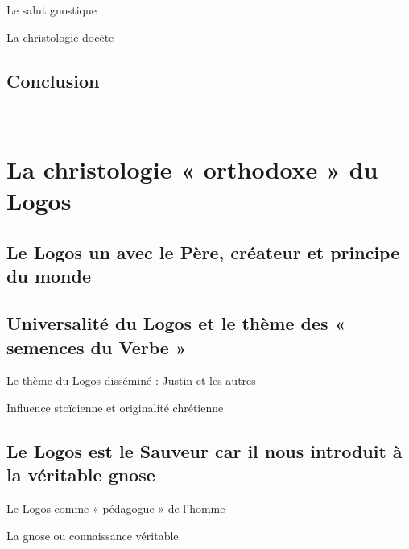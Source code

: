     
    
    
      
      Le salut gnostique
      
    
      
      La christologie docète
      
    
  
    
    \subsection{Conclusion}
    
  
 ~
  \hypertarget{la-christologie-orthodoxe-du-logos}{%
  \section{La christologie « orthodoxe » du
  Logos}\label{la-christologie-orthodoxe-du-logos}}

  
  
  
    
    \subsection{Le Logos un avec le Père, créateur et principe du monde}
    
  
    
    \subsection{Universalité du Logos et le thème des « semences du Verbe »}
    

    
    
    
      
      Le thème du Logos disséminé : Justin et les autres
      
    
      
      Influence stoïcienne et originalité chrétienne
      
    
  
    
    \subsection{Le Logos est le Sauveur car il nous introduit à la véritable
    gnose}
    

    
    
    
      
      Le Logos comme « pédagogue » de l'homme
      
    
      
      La gnose ou connaissance véritable
      
